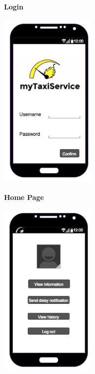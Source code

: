 		\paragraph{Login}
		\begin{center}
		    \includegraphics[width=0.35\textwidth]{./images/TELEFONO3}
		\end{center}
		\paragraph{Home Page}
		\begin{center}
		    \includegraphics[width=0.35\textwidth]{./images/TELEFONO4}
		\end{center}
